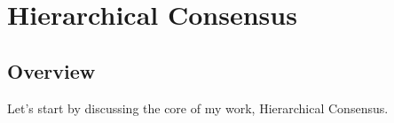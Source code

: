 
\renewcommand{\thechapter}{2}

\chapter{Hierarchical Consensus}

\section{Overview}

Let's start by discussing the core of my work, Hierarchical Consensus. 
